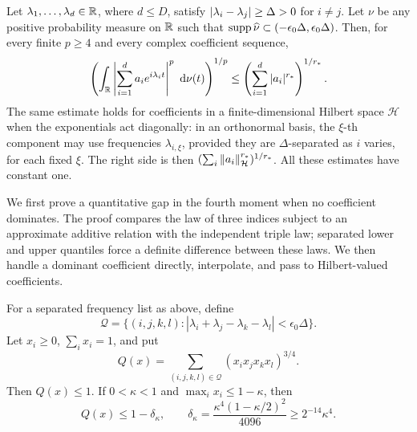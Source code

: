 \begin{proposition}
\label{phase:finite-fourier}
Let \(\lambda_1,\ldots,\lambda_d\in\mathbb R\), where \(d\le D\), satisfy
\(\left|\lambda_i-\lambda_j\right|\ge\Delta>0\) for \(i\ne j\).
Let \(\nu\) be any positive probability measure on \(\mathbb R\) such that
\(\operatorname{supp}\widehat\nu\subset(-\epsilon_0\Delta,\epsilon_0\Delta)\).
Then, for every finite \(p\ge4\) and every complex coefficient sequence,
\begin{equation}
 \left(\int_\mathbb R
       \left|\sum_{i=1}^d a_i e^{i\lambda_i t}\right|^p
       \,\,\mathrm d\nu(t)\right)^{1/p}
 \le \left(\sum_{i=1}^d |a_i|^{r_*}\right)^{1/r_*}.
 \label{eq:src-13}
\end{equation}
The same estimate holds for coefficients in a finite-dimensional Hilbert
space \(\mathcal H\) when the exponentials act diagonally: in an
orthonormal basis, the \(\xi\)-th component may use frequencies
\(\lambda_{i,\xi}\), provided they are \(\Delta\)-separated as \(i\)
varies, for each fixed \(\xi\).  The right side is then
\( (\sum_i\left\|a_i\right\|_{\mathcal H}^{r_*})^{1/r_*}\).
All these estimates have constant one.
\end{proposition}

We first prove a quantitative gap in the fourth moment when no
coefficient dominates. The proof compares the law of three indices
subject to an approximate additive relation with the independent triple
law; separated lower and upper quantiles force a definite difference
between these laws. We then handle a dominant coefficient directly,
interpolate, and pass to Hilbert-valued coefficients.

\begin{lemma}
\label{phase:quantile-gap}
For a separated frequency list as above, define
\[
 \mathcal Q=\{(i,j,k,l):
    |\lambda_i+\lambda_j-\lambda_k-\lambda_l|
       <\epsilon_0\Delta\}.
\]
Let \(x_i\ge0\), \(\sum_i x_i=1\), and put
\[
 Q(x)=\sum_{(i,j,k,l)\in\mathcal Q}
                (x_i x_j x_k x_l)^{3/4}.
\]
Then \(Q(x)\le1\).  If \(0<\kappa<1\) and
\(\max_i x_i\le1-\kappa\), then
\begin{equation}
 Q(x)\le1-\delta_\kappa,
 \qquad
 \delta_\kappa=
       \frac{\kappa^4(1-\kappa/2)^2}{4096}
       \ge 2^{-14}\kappa^4.
 \label{phase:quantitative-gap}
\end{equation}
\end{lemma}

